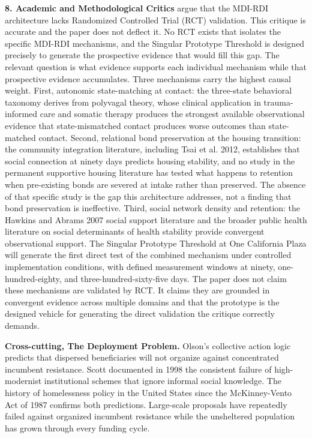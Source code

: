 \documentclass[12pt, letterpaper]{article}
\begin{document}
\textbf{8. Academic and Methodological Critics} argue that the MDI-RDI architecture lacks Randomized Controlled Trial (RCT) validation. This critique is accurate and the paper does not deflect it. No RCT exists that isolates the specific MDI-RDI mechanisms, and the Singular Prototype Threshold is designed precisely to generate the prospective evidence that would fill this gap. The relevant question is what evidence supports each individual mechanism while that prospective evidence accumulates. Three mechanisms carry the highest causal weight. First, autonomic state-matching at contact: the three-state behavioral taxonomy derives from polyvagal theory, whose clinical application in trauma-informed care and somatic therapy produces the strongest available observational evidence that state-mismatched contact produces worse outcomes than state-matched contact. Second, relational bond preservation at the housing transition: the community integration literature, including Tsai et al. 2012, establishes that social connection at ninety days predicts housing stability, and no study in the permanent supportive housing literature has tested what happens to retention when pre-existing bonds are severed at intake rather than preserved. The absence of that specific study is the gap this architecture addresses, not a finding that bond preservation is ineffective. Third, social network density and retention: the Hawkins and Abrams 2007 social support literature and the broader public health literature on social determinants of health stability provide convergent observational support. The Singular Prototype Threshold at One California Plaza will generate the first direct test of the combined mechanism under controlled implementation conditions, with defined measurement windows at ninety, one-hundred-eighty, and three-hundred-sixty-five days. The paper does not claim these mechanisms are validated by RCT. It claims they are grounded in convergent evidence across multiple domains and that the prototype is the designed vehicle for generating the direct validation the critique correctly demands.

\textbf{Cross-cutting, The Deployment Problem.} Olson's collective action logic predicts that dispersed beneficiaries will not organize against concentrated incumbent resistance. Scott documented in 1998 the consistent failure of high-modernist institutional schemes that ignore informal social knowledge. The history of homelessness policy in the United States since the McKinney-Vento Act of 1987 confirms both predictions. Large-scale proposals have repeatedly failed against organized incumbent resistance while the unsheltered population has grown through every funding cycle.
\end{document}
